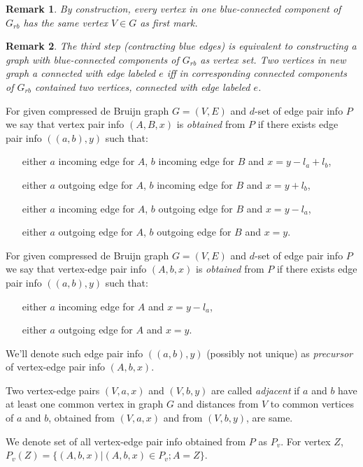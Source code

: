 \documentclass[12pt,a4paper,oneside]{article}
\newtheorem{remark}{Remark}
\begin{document}
\begin{remark}
  By construction, every vertex in one blue-connected component of $G_{rb}$ has the same vertex $V \in G$ as first mark.
\end{remark}

\begin{remark}
 The third step (contracting blue edges) is equivalent to constructing a graph with blue-connected components of $G_{rb}$ as vertex set. Two vertices in new graph a connected with edge labeled $e$ iff in corresponding connected components of $G_{rb}$ contained two vertices, connected with edge labeled $e$.  
\end{remark}


For given compressed de Bruijn graph $G=(V,E)$ and $d$-set of edge pair info $P$ 
we say that vertex pair info $(A, B, x)$ is \emph{obtained} from $P$ if there exists edge pair info $((a,b),y)$ such that:
\begin{itemize}
\item[either] $a$ incoming edge for $A$, $b$ incoming edge for $B$ and $x=y-l_a+l_b$, 
\item[either] $a$ outgoing edge for $A$, $b$ incoming edge for $B$ and $x=y+l_b$, 
\item[either] $a$ incoming edge for $A$, $b$ outgoing edge for $B$ and $x=y-l_a$, 
\item[either] $a$ outgoing edge for $A$, $b$ outgoing edge for $B$ and $x=y$. 
\end{itemize} 

For given compressed de Bruijn graph $G=(V,E)$ and $d$-set of edge pair info $P$ 
we say that vertex-edge pair info $(A, b, x)$ is \emph{obtained} from $P$ if there exists edge pair info $((a,b),y)$ such that:
\begin{itemize}
\item[either] $a$ incoming edge for $A$ and $x=y-l_a$, 
\item[either] $a$ outgoing edge for $A$ and $x=y$. 
\end{itemize} 
We'll denote such edge pair info $((a, b), y)$ (possibly not unique) as \emph{precursor} of vertex-edge pair info $(A, b, x)$.

Two vertex-edge pairs $(V,a,x)$ and $(V,b,y)$ are called \emph{adjacent} if $a$ and $b$ have at least one common vertex in graph $G$ and distances from $V$ to common vertices of $a$ and $b$, obtained from $(V,a,x)$ and from $(V,b,y)$, are same. 


We denote set of all vertex-edge pair info obtained from $P$ as $P_v$.
For vertex $Z$, $P_v(Z) = \{(A, b, x)|(A, b, x) \in P_v; A = Z\}$.
 
\end{document}
